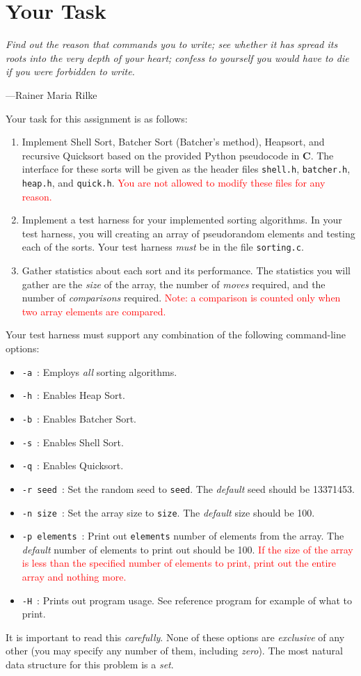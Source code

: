 \section{Your Task}\label{task}

\epigraph{\emph{Find out the reason that commands you to write; see whether it has spread its roots into the very depth of your heart; confess to yourself you would have to die if you were forbidden to write.}}{---Rainer Maria Rilke}

\noindent Your task for this assignment is as follows:

\begin{enumerate}
  \item Implement Shell Sort, Batcher Sort (Batcher's method), Heapsort, and
    recursive Quicksort based on the provided Python pseudocode in \textbf{C}.
    The interface for these sorts will be given as the header files
    \texttt{shell.h}, \texttt{batcher.h}, \texttt{heap.h}, and \texttt{quick.h}.
    \textcolor{red}{You are not allowed to modify these files for any reason.}
  \item Implement a test harness for your implemented sorting
    algorithms. In your test harness, you will creating an array of
    pseudorandom elements and testing each of the sorts. Your test harness
    \emph{must} be in the file \texttt{sorting.c}.
  \item Gather statistics about each sort and its performance. The
    statistics you will gather are the \emph{size} of the array, the
    number of \emph{moves} required, and the number of
    \emph{comparisons} required. \textcolor{red}{Note: a comparison is
    counted only when two array elements are compared.}
\end{enumerate}

Your test harness must support any combination of the following
command-line options:

\begin{itemize}
  \item \texttt{-a}\ : Employs \emph{all} sorting algorithms.
  \item \texttt{-h}\ : Enables Heap Sort.
  \item \texttt{-b}\ : Enables Batcher Sort.
  \item \texttt{-s}\ : Enables Shell Sort.
  \item \texttt{-q}\ : Enables Quicksort.
  \item \texttt{-r seed}\ : Set the random seed to \texttt{seed}.
    The \emph{default} seed should be 13371453.
  \item \texttt{-n size}\ : Set the array size to \texttt{size}. The
    \emph{default} size should be 100.
  \item \texttt{-p elements}\ : Print out \texttt{elements} number of
    elements from the array. The \emph{default} number of elements to
    print out should be 100. \textcolor{red}{If the size of the array is
      less than the specified number of elements to print, print out the
    entire array and nothing more.}
  \item \texttt{-H}\ : Prints out program usage. See reference program
    for example of what to print.
\end{itemize}

It is important to read this \emph{carefully}. None of these options are
\emph{exclusive} of any other (you may specify any number of them,
including \emph{zero}). The most natural data structure for this
problem is a \emph{set}.

